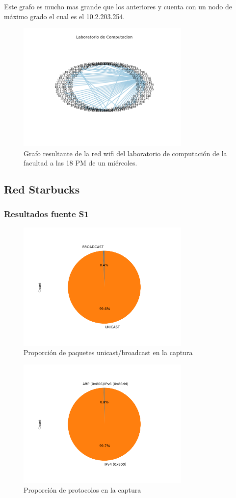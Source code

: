 Este grafo es mucho mas grande que los anteriores y cuenta con un nodo de máximo grado el cual es el 10.2.203.254.

\begin{figure}[H]
 \centering
	\includegraphics[width=8.5cm]{figs/dc.png}
	\caption{Grafo resultante de la red wifi del laboratorio de computación de la facultad a las 18 PM de un miércoles.}
	\label{fig:dc-grafo}
\end{figure}

\subsection*{Red Starbucks}
\subsubsection*{Resultados fuente S1}
\begin{figure}[H]
  \centering
  \includegraphics[width=8.5cm]{figs/broadcast_proportion_starbucks_S1_output.png}
  \caption{\normalfont Proporción de paquetes unicast/broadcast en la captura}
\end{figure}

\begin{figure}[H]
  \centering
  \includegraphics[width=8.5cm]{figs/protocols_proportion_starbucks_S1_output.png}
  \caption{\normalfont Proporción de protocolos en la captura}
\end{figure}

